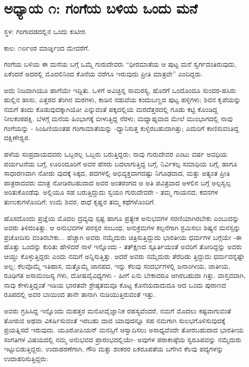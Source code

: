 
\chapter{ಅಧ್ಯಾಯ ೧: ಗಂಗೆಯ ಬಳಿಯ ಒಂದು ಮನೆ}

ಸ್ಥಳ: ಗಂಗಾದಡದಲ್ಲಿನ ಒಂದು ಕುಟೀರ.

ಕಾಲ: ೧೮೯೮ರ ಮಾರ್ಚ್ನಿಂದ ಮೇವರೆಗೆ.

ಗಂಗೆಯ ಬಳಿಯ ಈ ಮನೆಯ ಬಗ್ಗೆ ಒಮ್ಮೆ ಗುರುದೇವರು “ಧೀರಮಾತೆಯ ಆ ಪುಟ್ಟ ಮನೆ ಸ್ವರ್ಗದಂತಿರುವುದು, ಏಕೆಂದರೆ ಅದರಲ್ಲಿ ಮೊದಲಿನಿಂದ ಕೊನೆಯ ವರೆಗೂ ಇರುವುದು ಪ್ರೀತಿ ಮಾತ್ರವೇ” ಎಂದಿದ್ದರು.

ಅದು ನಿಜವಾಗಿಯೂ ಹಾಗೆಯೇ ಇದ್ದಿತು. ಒಳಗೆ ಅವಿಚ್ಛಿನ್ನ ಸಾಮರಸ್ಯ, ಹೊರಗೆ ಒಂದೊಂದೂ ಸುಂದರ-ಹಸಿರು ಹುಲ್ಲಿನ ಹಾಸು, ಎತ್ತರದ ತೆಂಗಿನ ಮರಗಳು, ಕಾಡಿನ ನಡುವೆಯ ಕಂದುಬಣ್ಣದ ಪುಟ್ಟ ಹಳ್ಳಿಗಳು; ಶಿವನ ಕೃಪೆಯನ್ನು ನಮಗೆ ತಂದು ಕೊಡುವುದಕ್ಕಾಗಿಯೋ ಎನ್ನುವಂತೆ ಪಕ್ಕದಲ್ಲಿಯ ಮರದೆತ್ತರದಲ್ಲಿ ಗೂಡು ಕಟ್ಟಿ ಕೊಂಡಿದ್ದ ನೀಲಕಂಠಪಕ್ಷಿ. ಬೆಳಗ್ಗೆ ಮನೆಯ ಹಿಂಭಾಗಕ್ಕೆ ಬೀಳುತ್ತಿದ್ದ ನೆರಳು; ಮಧ್ಯಾಹ್ನವಾದ ಮೇಲೆ ಮುಂಭಾಗದಲ್ಲಿ ನಾವು ಗಂಗೆಯನ್ನು - ಸಿಂಹಿಣಿಯಂತಹ ಗಂಗಾಮಾತೆಯನ್ನು -ಧ್ಯಾನಿಸುತ್ತ ಕುಳ್ಳಿರಬಹುದಾಗಿತ್ತು; ಎದುರಿಗೆ ಕಾಣಿಸುವಂತಿದ್ದ ದಕ್ಷಿಣೇಶ್ವರ.

ಹಳೆಯ ಸಂಪ್ರದಾಯದವರು ಒಬ್ಬರಲ್ಲ ಒಬ್ಬರು ಬರುತ್ತಿದ್ದರು; ನಾವು ಗುರುದೇವರ ಎಂಟು ವರ್ಷ ಅವಧಿಯ ಪರ್ಯಟನೆಯ ಬಗ್ಗೆ, ಊರಿಂದೂರಿಗೆ ಅವರ ಹೆಸರು ಬದಲಾಗುತ್ತಿದ್ದ ಬಗ್ಗೆ, ನಿರ್ವಿಕಲ್ಪ ಸಮಾಧಿಯ ಬಗ್ಗೆ, ಹಾಗೂ ಸಾಧಾರಣವಾಗಿ ನೋಡು ವುದಕ್ಕೆ ಸಿಕ್ಕದ, ಪದಗಳಲ್ಲಿ ಅಭಿವ್ಯಕ್ತವಾಗದಷ್ಟು ನಿಗೂಢವಾದ, ಮತ್ತು ಅತ್ಯಂತ ಪ್ರೀತಿ ಪಾತ್ರರಾದವರು ಮಾತ್ರ ನೋಡಿರಬಹುದಾದ ಅವರ ಅಂತರಂಗದ ಆ ಅತಿ ಪವಿತ್ರವಾದ ಅಳಲಿನ ಬಗ್ಗೆ ಅಲ್ಪಸ್ವಲ್ಪ ಅರಿತುಕೊಂಡೆವು. ಅಲ್ಲಿಯೂ ಸಹ ಬರುತ್ತಿದ್ದುದು ಸ್ವಯಂ ಗುರುದೇವರೇ - ತಮ್ಮ ಗಾಯನದ, ಕವನಗಳ ತುಣುಕುಗಳೊಂದಿಗೆ; ಉಮೆ ಶಿವರ, ರಾಧೆ ಕೃಷ್ಣರ ತಮ್ಮ ಕಥೆಗಳೊಂದಿಗೆ.

ಹೊಸದೊಂದು ಪ್ರಜ್ಞೆಯ ಮೊದಲ ದ್ರವ್ಯವು ಸ್ಪಷ್ಟ ಹಾಗೂ ಪ್ರತ್ಯೇಕ ಅನುಭವಗಳ ಸರಣಿಯಾಗಿರಬೇಕು ಎಂಬುದನ್ನು ಅವರು ತಿಳಿದಂತಿತ್ತು. ಆ ಅನುಭವಗಳ ಪರಸ್ಪರ ಸಂಬಂಧ, ಅನುಕ್ರಮಗಳ ಕಲ್ಪನೆಗಾಗಿ ಶ್ರಮಿಸಲು ಶಿಷ್ಯನ ಮನಸ್ಸನ್ನು ಪ್ರಚೋದಿಸು ವಂತಿರಬೇಕು... ಹೆಚ್ಚಾಗಿ ಅವರು ನಮ್ಮೆದುರು ಚಿತ್ರಿಸುತ್ತಿದ್ದುದು ಭಾರತೀಯ ಧರ್ಮಗಳ ಬಗ್ಗೆಯೇ -ಈ ಹೊತ್ತು ಒಂದನ್ನು ಕುರಿತು ಹೇಳಿದರೆ ನಾಳೆ ಇನ್ನೊಂದು - ತತ್ಕ್ಷಣದ ಸ್ಪೂರ್ತಿಯಂತೆ ಅವರಿಗೆ ತೋರಿದ್ದನ್ನು ಅವರು ಆಯ್ದು ಕೊಳ್ಳುತ್ತಿದ್ದರು ಎಂದು ನಮಗೆ ಅನ್ನಿಸುತ್ತಿತ್ತು. ಆದರೆ ಅವರು ನಮ್ಮೆದುರು ತೆರೆದಿಡು ತ್ತಿದ್ದುದು ಧರ್ಮವನ್ನಷ್ಟೇ ಅಲ್ಲ; ಕೆಲವೊಮ್ಮೆ ಇತಿಹಾಸ, ಮತ್ತೊಮ್ಮೆ ಜಾನಪದ, ಇನ್ನು ಕೆಲವು ಸಂದರ್ಭಗಳಲ್ಲಿ ಜನಾಂಗೀಯ, ಜಾತೀಯ, ರೂಢಿಗತ ಅಸಾಮಂಜಸ್ಯ ಗಳು, ದೋಷವೈವಿಧ್ಯಗಳು - ಹೀಗೆ ಏನು ಬೇಕಾದರೂ ಆಗಿರಬಹುದಾ ಗಿತ್ತು. ವಾಸ್ತವವಾಗಿ, ನಾವು ಕೇಳುತ್ತಿದ್ದಂತೆ ಇಡಿಯ ಭಾರತವೇ ಶ್ರೇಷ್ಠತಮವೂ ಕೊಟ್ಟ ಕೊನೆಯದಾದುದೂ ಆದ ಒಂದು ಪುರಾಣದ ರೂಪದಲ್ಲಿ ಅವರ ಬಾಯಿಂದ ತಾನೇ ತಾನಾಗಿ ನುಡಿಯುತ್ತಿರುವಂತೆ ಇತ್ತು.

ಅವರು ಗ್ರಹಿಸಿದ್ದ ಇನ್ನೊಂದು ಮಹತ್ತರ ಮನೋವೈಜ್ಞಾನಿಕ ರಹಸ್ಯವೆಂದರೆ, ನಮಗೆ ಮೊದಲು ಕಷ್ಟವಾಗುವಂತೆ ತೋರುವ ಅಥವಾ ವಿಕರ್ಷಿಸುವಂತೆ ಇರಬಹು ದಾದ ಯಾವುದನ್ನೂ ಸಹ ನಮಗಾಗಿ ಸುಲಭಗೊಳಿಸುವುದಕ್ಕೆ ಪ್ರಯತ್ನಿಸದೆ ಇರುವುದು. ಯೂರೋಪಿಯನ್ ಮನಸ್ಸಿಗೆ ಆಸ್ವಾದಿಸಲು ಅಸಾಧ್ಯವೆಂದೇ ತೋರಬಹುದಾದ ಭಾರತೀಯ ಸಂಗತಿಗಳ ವಿಷಯದಲ್ಲಿ ನಮ್ಮ ಅನುಭವದ ಪ್ರಾರಂಭದಲ್ಲಿಯೇ- ಅವುಗಳ ಪರಾಕಾಷ್ಠೆಯ ಸ್ವರೂಪವನ್ನು ನಮ್ಮೆದುರು ಇಟ್ಟುಬಿಡುತ್ತಿದ್ದರು. ಉದಾಹರಣೆಗಾಗಿ, ಗೌರಿ ಮತ್ತು ಶಂಕರರ ಏಕರೂಪತೆಯ ಬಗೆಗಿನ ಕೆಲವು ಪದ್ಯಗಳನ್ನು ಉದಾಹರಿಸುತ್ತಿದ್ದರು:


